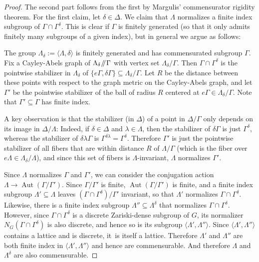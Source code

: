 \documentclass[11pt]{article}
\numberwithin{equation}{section}\providecommand{\llangle}{\langle\!\langle}\providecommand{\rrangle}{\rangle\!\rangle}\providecommand{\Asterisk}{\ast}
\newcommand{\sslash}{\mathbin{\mkern-3mu /\mkern-5mu/ \mkern-3mu}}
\DeclareMathOperator{\Aut}{Aut}
\theoremstyle{definition}
\begin{document}
\begin{proof} The second part follows from the first by Margulis' commensurator rigidity theorem. For the first claim, let $\delta\in\Delta$. We claim that $\Lambda$ normalizes a finite index subgroup of $\Gamma\cap\Gamma^\delta$. This is clear if $\Gamma$ is finitely generated (so that it only admits finitely many subgroups of a given index), but in general we argue as follows:

The group $\Lambda_\delta:=\langle \Lambda,\delta\rangle$ is finitely generated and has commensurated subgroup $\Gamma$. Fix a Cayley-Abels graph of $\Lambda_\delta\sslash\Gamma$ with vertex set $\Lambda_\delta/\Gamma$. Then $\Gamma\cap\Gamma^\delta$ is the pointwise stabilizer in $\Lambda_\delta$ of $\{e\Gamma,\delta\Gamma\}\subseteq \Lambda_\delta/\Gamma$. Let $R$ be the distance between these points with respect to the graph metric on the Cayley-Abels graph, and let $\Gamma'$ be the pointwise stabilizer of the ball of radius $R$ centered at $e\Gamma \in \Lambda_\delta/\Gamma$. Note that $\Gamma'\subseteq \Gamma$ has finite index.

A key observation is that the stabilizer (in $\Delta$) of a point in $\Delta/\Gamma$ only depends on its image in $\Delta/\Lambda$: Indeed, if $\delta\in\Delta$ and $\lambda\in\Lambda$, then the stabilizer of $\delta\Gamma$ is just $\Gamma^\delta$, whereas the stabilizer of $\delta\lambda\Gamma$ is $\Gamma^{\delta\lambda}=\Gamma^\delta$. Therefore $\Gamma'$ is just the pointwise stabilizer of all fibers that are within distance $R$ of $\Lambda/\Gamma$ (which is the fiber over $e\Lambda\in\Lambda_\delta/\Lambda$), and since this set of fibers is $\Lambda$-invariant, $\Lambda$ normalizes $\Gamma'$.

Since $\Lambda$ normalizes $\Gamma$ and $\Gamma'$, we can consider the conjugation action $\Lambda\to\Aut(\Gamma/\Gamma')$. Since $\Gamma/\Gamma'$ is finite, $\Aut(\Gamma/\Gamma')$ is finite, and a finite index subgroup $\Lambda'\subseteq\Lambda$ leaves $(\Gamma\cap\Gamma^\delta)/\Gamma'$ invariant, so that $\Lambda'$ normalizes $\Gamma\cap\Gamma^\delta$. Likewise, there is a finite index subgroup $\Lambda''\subseteq \Lambda^\delta$ that normalizes $\Gamma\cap\Gamma^\delta$. However, since $\Gamma\cap\Gamma^\delta$ is a discrete Zariski-dense subgroup of $G$, its normalizer $N_G(\Gamma\cap\Gamma^\delta)$ is also discrete, and hence so is its subgroup $\langle \Lambda',\Lambda'' \rangle$. Since $\langle \Lambda', \Lambda''\rangle$ contains a lattice and is discrete, it~is itself a lattice. Therefore $\Lambda'$ and $\Lambda''$ are both finite index in $\langle \Lambda',\Lambda''\rangle$ and hence are commensurable. And therefore $\Lambda$ and $\Lambda^{\delta}$ are also commensurable. \end{proof}
\end{document}
